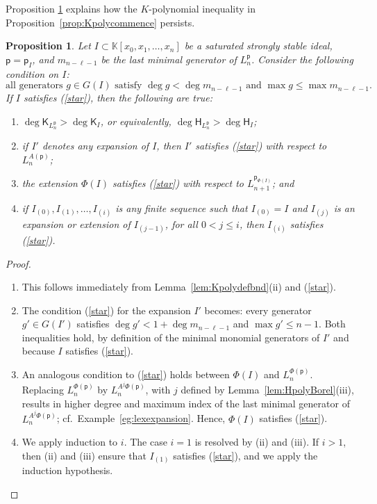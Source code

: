 \documentclass[12pt]{amsart}%
\newtheorem{proposition}[theorem]{Proposition}
\theoremstyle{definition}%
\newcommand{\hp}{\mathsf{p}}%
\newcommand{\lift}{\Phi}%
\newcommand{\plus}{A}%
\newcommand{\hs}{\mathsf{H}}%
\newcommand{\hk}{\mathsf{K}}%
\newcommand{\kk}{\mathbb{K}}%
\begin{document}
Proposition \ref{prop:Kpolypersist} explains how the $K$-polynomial
inequality in Proposition~\ref{prop:Kpolycommence} persists.

\begin{proposition} 
  \label{prop:Kpolypersist}
  Let $I \subset \kk[x_0, x_1, \dotsc , x_n]$ be a saturated strongly
  stable ideal, $\hp = \hp_I$, and $m_{n-\ell-1}$ be the last minimal
  generator of $L^{\hp}_n$.  Consider the following condition on $I$:
  \[
  \text{all generators $g \in G(I)$ satisfy $\deg g < \deg
    m_{n-\ell-1}$ and $\max g \le \max m_{n-\ell-1}$.}
  \tag{$\star$} \label{star}
  \]
  If $I$ satisfies (\ref{star}), then the following are true:
  \begin{enumerate}
  \item $\deg \hk_{L^{\hp}_n} > \deg \hk_I$, or equivalently, $\deg
    \hs_{L^{\hp}_n} > \deg \hs_I$;

  \item if $I'$ denotes any expansion of $I$, then $I'$ satisfies
    (\ref{star}) with respect to $L^{\plus (\hp)}_n$;

  \item the extension $\lift ( I )$ satisfies (\ref{star}) with
    respect to $L^{\hp_{\lift (I)}}_{n+1}$; and

  \item if $I_{(0)}, I_{(1)}, \dotsc, I_{(i)}$ is any finite sequence
    such that $I_{(0)} = I$ and $I_{(j)}$ is an expansion or extension
    of $I_{(j-1)}$, for all $0 < j \le i$, then $I_{(i)}$ satisfies
    (\ref{star}).
  \end{enumerate}
\end{proposition}

\begin{proof} $\;$
  \begin{enumerate}
  \item This follows immediately from Lemma~\ref{lem:Kpolydefbnd}(ii)
    and (\ref{star}).
 
  \item The condition (\ref{star}) for the expansion $I'$ becomes:
    every generator $g' \in G(I')$ satisfies $\deg g' < 1 + \deg m_{n
      - \ell - 1}$ and $\max g' \le n-1$.  Both inequalities hold, by
    definition of the minimal monomial generators of $I'$ and because
    $I$ satisfies (\ref{star}).
  
  \item An analogous condition to (\ref{star}) holds between $\lift (
    I )$ and $L^{\lift (\hp)}_n$.  Replacing $L^{\lift (\hp)}_n$ by
    $L^{\plus^j \lift (\hp)}_n$, with $j$ defined by
    Lemma~\ref{lem:HpolyBorel}(iii), results in higher degree and
    maximum index of the last minimal generator of $L^{\plus^j \lift
      (\hp)}_n$; cf.\ Example~\ref{eg:lexexpansion}.  Hence, $\lift (
    I )$ satisfies (\ref{star}).

  \item We apply induction to $i$.  The case $i = 1$ is resolved by
    (ii) and (iii).  If $i > 1$, then (ii) and (iii) ensure that
    $I_{(1)}$ satisfies (\ref{star}), and we apply the induction
    hypothesis. \qedhere
  \end{enumerate}
\end{proof}
\end{document}
